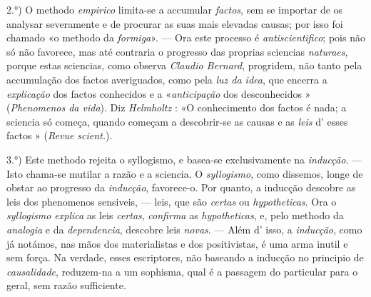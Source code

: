2.°) O methodo \emph{empirico} limita-se a accumular \emph{factos}, sem se importar de os analysar severamente e de procurar as suas mais elevadas causas; por isso foi chamado «o methodo da \emph{formiga}». --- Ora este processo é \emph{antiscientifico}; pois não só não favorece, mas até contraria o progresso das proprias sciencias \emph{naturaes}, porque estas sciencias, como observa \emph{Claudio Bernard}, progridem, não tanto pela accumulação dos factos averiguados, como pela \emph{luz da idea}, que encerra a \emph{explicação} dos factos conhecidos e a «\emph{anticipação} dos desconhecidos » (\emph{Phenomenos da vida}). Diz \emph{Helmholtz} : «O conhecimento dos factos é nada; a sciencia só começa, quando começam a descobrir-se as causas e as \emph{leis} d' esses factos » (\emph{Revue scient.}).

3.°) Este methodo rejeita o syllogismo, e basea-se exclusivamente na \emph{inducção}. --- Isto chama-se mutilar a razão e a sciencia. O \emph{syllogismo}, como dissemos, longe de obstar ao progresso da \emph{inducção}, favorece-o. Por quanto, a inducção descobre as leis dos phenomenos sensiveis, --- leis, que são \emph{certas} ou \emph{hypotheticas}. Ora o \emph{syllogismo explica} as leis \emph{certas}, \emph{confirma} as \emph{hypotheticas}, e, pelo methodo da \emph{analogia} e da \emph{dependencia}, descobre leis \emph{novas}. --- Além d' isso, a \emph{inducção}, como já notámos, nas mãos dos materialistas e dos positivistas, é uma arma inutil e sem força. Na verdade, esses escriptores, não baseando a inducção no principio de \emph{causalidade}, reduzem-na a um sophisma, qual é a passagem do particular para o geral, sem razão sufficiente.

